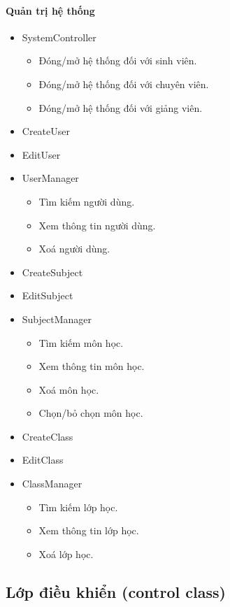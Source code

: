 \documentclass[12pt]{book}
\begin{document}
      \paragraph{Quản trị hệ thống}
      \begin{itemize}
        \item SystemController
        \begin{itemize}
          \item Đóng/mở hệ thống đối với sinh viên.
          \item Đóng/mở hệ thống đối với chuyên viên.
          \item Đóng/mở hệ thống đối với giảng viên.
        \end{itemize}
        \item CreateUser
        \item EditUser
        \item UserManager
        \begin{itemize}
          \item Tìm kiếm người dùng.
          \item Xem thông tin người dùng.
          \item Xoá người dùng.
        \end{itemize}
        \item CreateSubject
        \item EditSubject
        \item SubjectManager
        \begin{itemize}
          \item Tìm kiếm môn học.
          \item Xem thông tin môn học.
          \item Xoá môn học.
          \item Chọn/bỏ chọn môn học.
        \end{itemize}
        \item CreateClass
        \item EditClass
        \item ClassManager
        \begin{itemize}
          \item Tìm kiếm lớp học.
          \item Xem thông tin lớp học.
          \item Xoá lớp học.
        \end{itemize}
      \end{itemize}

    \subsection{Lớp điều khiển (control class)}
      
\end{document}
